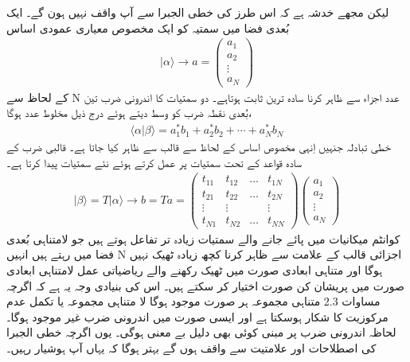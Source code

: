 	لیکن مجھے خدشہ ہے کہ اس طرز کی خطی الجبرا سے آپ واقف نہیں ہون گے۔ ایک بُعدی فضا میں سمتیہ کو ایک مخصوص معیاری عمودی اساس
	\begin{align}
		|\alpha \rangle \rightarrow a = \begin{pmatrix} 
			a_{1}\\
			a_{2}\\
			\vdots\\
			a_{N}
		 \end{pmatrix}
	\end{align}
کے لحاظ سے N عدد اجزاء  
 سے ظاہر کرنا سادہ ترین ثابت ہوتاہے۔ دو سمتیات کا اندرونی ضرب   تین بُعدی نقطہ ضرب کو وسط دیتے ہوئے درج ذیل مخلوط عدد ہوگا،
\begin{align}
	\langle \alpha | \beta\rangle =a_1^{\ast}b_1 + a_2^{\ast}b_2 + \dotsb +a_N^{\ast}b_N
\end{align}
خطی تبادلہ  جنہیں اِنہی مخصوص اساس کے لحاظ سے قالب سے ظاہر کیا جاتا ہے۔ قالبی ضرب کے سادہ قواعد کے تحت سمتیات پر عمل کرتے ہوئے نئے سمتیات پیدا کرتا ہے۔
\begin{align}
	|\beta\rangle = T|\alpha \rangle \rightarrow b = Ta = \begin{pmatrix}
		t_{11} & t_{12} & \hdots & t_{1N} \\ 
		t_{21} & t_{22} & \hdots & t_{2N} \\
		\vdots & \vdots &        & \vdots \\
		t_{N1} & t_{N2} & \hdots & t_{NN} 
	\end{pmatrix}
\begin{pmatrix}
	a_{1}\\
	a_{2}\\
	\vdots\\
	a_{N}
\end{pmatrix}
\end{align}
کوانٹم میکانیات میں پائے جانے والے سمتیات زیادہ تر تفاعل ہوتے ہیں جو لامتناہی بُعدی فضا میں رہتے ہیں انہیں N اجزائی قالب کے علامت سے ظاہر کرنا کچھ زیادہ ٹھیک نہیں ہوگا اور متناہی ابعادی صورت میں ٹھیک رکھنے والے ریاضیاتی عمل لامتناہی ابعادی صورت  میں پریشان کن صورت اختیار کر سکتے ہیں۔ اس کی بنیادی وجہ یہ ہے کہ اگرچہ  مساوات 2.3 متناہی مجموعہ ہر صورت موجود ہوگا لا متناہی مجموعہ یا تکمل عدم مرکوزیت کا شکار ہوسکتا ہے اور ایسی صورت میں اندرونی ضرب غیر موجود ہوگا۔ لحاظہ اندرونی ضرب پر مبنی کوئی بھی دلیل بے معنی ہوگی۔ یوں اگرچہ خطی الجبرا کی اصطلاحات اور علامتیت سے واقف ہوں گے بہتر ہوگا کہ یہاں آپ ہوشیار رہیں۔

